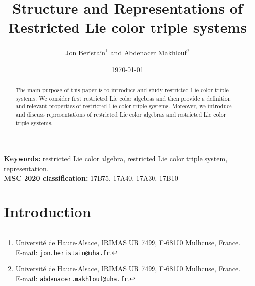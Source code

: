 \documentclass[11pt, twoside]{article}
\title{Structure and Representations of Restricted Lie color triple systems}
\author{Jon Beristain\footnote{Université de Haute-Alsace, IRIMAS UR 7499, F-68100 Mulhouse, France. \\ E-mail: \texttt{jon.beristain@uha.fr}. }  \; and  Abdenacer Makhlouf\footnote{Université de Haute-Alsace, IRIMAS UR 7499, F-68100 Mulhouse, France.\\ E-mail:  \texttt{abdenacer.makhlouf@uha.fr}.} }
\date{\today}
\begin{document}
	
	\newtheorem{thm}{Theorem}[section]
	\newtheorem{prop}[thm]{Proposition}
	\newtheorem{lem}[thm]{Lemma}
	\newtheorem{cor}[thm]{Corollary}
	\theoremstyle{definition}
	\newtheorem{defi}[thm]{Definition}
	\newtheorem*{rmq}{Remark}
	\newtheorem{ex}[thm]{Example}
	
	\maketitle
	\begin{abstract}
    The main purpose of this paper is to introduce and study restricted Lie color triple systems. We consider first restricted Lie color algebras and then provide a definition and relevant properties of restricted Lie color triple systems.  Moreover, we introduce and discuss representations of restricted Lie color algebras and restricted Lie color triple systems.
		
	\end{abstract}
	
	\noindent\textbf{Keywords:} restricted Lie color algebra, restricted Lie color triple system, representation.\\
	\noindent\textbf{MSC 2020 classification: 	} 17B75, 17A40, 	17A30,  17B10.
	\tableofcontents
	
\section{Introduction}
\end{document}
